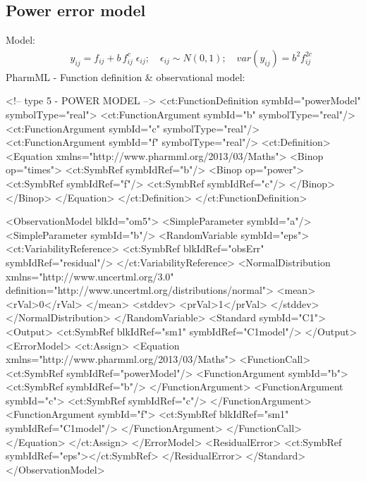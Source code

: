 \documentclass[a4paper,10pt]{article}
\begin{document}
\subsection{Power error model}
\label{model5}
Model:
\begin{eqnarray}
&& y_{ij} = f_{ij} + b\,f_{ij}^c \; \epsilon_{ij}; \quad \epsilon_{ij} \sim N(0,1); \quad \mathit{var}(y_{ij}) = b^2f_{ij}^{2c} \nonumber
\end{eqnarray}
PharmML - Function definition \& observational model:
\begin{xmlcode}
<!-- type 5 - POWER MODEL -->
<ct:FunctionDefinition symbId="powerModel" symbolType="real">
    <ct:FunctionArgument symbId="b" symbolType="real"/>
    <ct:FunctionArgument symbId="c" symbolType="real"/>
    <ct:FunctionArgument symbId="f" symbolType="real"/>
    <ct:Definition>
        <Equation xmlns="http://www.pharmml.org/2013/03/Maths">
            <Binop op="times">
                <ct:SymbRef symbIdRef="b"/>
                <Binop op="power">
                    <ct:SymbRef symbIdRef="f"/>
                    <ct:SymbRef symbIdRef="c"/>
                </Binop>
            </Binop>
        </Equation>
    </ct:Definition>
</ct:FunctionDefinition>

<ObservationModel blkId="om5">
    <SimpleParameter symbId="a"/>
    <SimpleParameter symbId="b"/>
    <RandomVariable symbId="eps">
        <ct:VariabilityReference>
            <ct:SymbRef blkIdRef="obsErr" symbIdRef="residual"/>
        </ct:VariabilityReference>
        <NormalDistribution xmlns="http://www.uncertml.org/3.0" definition="http://www.uncertml.org/distributions/normal">
            <mean>
                <rVal>0</rVal>
            </mean>
            <stddev>
                <prVal>1</prVal>
            </stddev>
        </NormalDistribution>
    </RandomVariable>
    <Standard symbId="C1">
        <Output>
            <ct:SymbRef blkIdRef="sm1" symbIdRef="C1model"/>
        </Output>
        <ErrorModel>
            <ct:Assign>
                <Equation xmlns="http://www.pharmml.org/2013/03/Maths">
                    <FunctionCall>
                        <ct:SymbRef symbIdRef="powerModel"/>
                        <FunctionArgument symbId="b">
                            <ct:SymbRef symbIdRef="b"/>
                        </FunctionArgument>
                        <FunctionArgument symbId="c">
                            <ct:SymbRef symbIdRef="c"/>
                        </FunctionArgument>
                        <FunctionArgument symbId="f">
                            <ct:SymbRef blkIdRef="sm1" symbIdRef="C1model"/>
                        </FunctionArgument>
                    </FunctionCall>
                </Equation>
            </ct:Assign>
        </ErrorModel>
        <ResidualError>
            <ct:SymbRef symbIdRef="eps"></ct:SymbRef>
        </ResidualError>
    </Standard>
</ObservationModel> 
\end{xmlcode}
\end{document}
